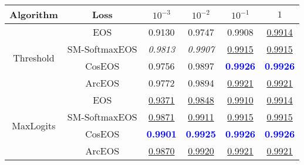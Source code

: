 \begin{table}[t]
\centering
\begin{tabularx}{.7\textwidth}{c|c|cccc}
\bf Algorithm & \bf Loss & $10^{-3}$ & $10^{-2}$ & $10^{-1}$ & $1$\\\hline\hline
\multirow{4}{*}{Threshold} & EOS & 0.9130 & 0.9747 & 0.9908 & \underline{0.9914}\\
 & SM-SoftmaxEOS & \it 0.9813 & \it 0.9907 & \underline{0.9915} & \underline{0.9915}\\
 & CosEOS & 0.9756 & 0.9897 & \textcolor{blue}{\bf 0.9926} & \textcolor{blue}{\bf 0.9926}\\
 & ArcEOS & 0.9772 & 0.9894 & \underline{0.9921} & \underline{0.9921}\\
\hline
\multirow{4}{*}{MaxLogits} & EOS & \underline{0.9371} & \underline{0.9848} & \underline{0.9910} & \underline{0.9914}\\
 & SM-SoftmaxEOS & \underline{0.9871} & \underline{0.9911} & \underline{0.9915} & \underline{0.9915}\\
 & CosEOS & \textcolor{blue}{\bf 0.9901} & \textcolor{blue}{\bf 0.9925} & \textcolor{blue}{\bf 0.9926} & \textcolor{blue}{\bf 0.9926}\\
 & ArcEOS & \underline{0.9870} & \underline{0.9920} & \underline{0.9921} & \underline{0.9921}\\
\hline
\end{tabularx}
\end{table}